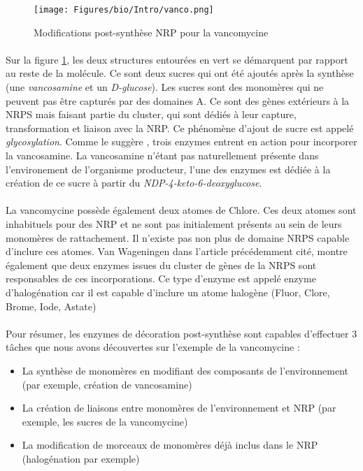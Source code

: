 \documentclass[12pt,french,twoside]{report}
\begin{document}
\begin{figure}[h!]
  \begin{center}
    \texttt{[image: Figures/bio/Intro/vanco.png]}
    \caption{\label{vanco}Modifications post-synthèse NRP pour la vancomycine}
  \end{center}
\end{figure}

\paragraph{}Sur la figure \ref{vanco}, les deux structures entourées en vert se démarquent par rapport au reste de la molécule.
Ce sont deux sucres qui ont été ajoutés après la synthèse (une \textit{vancosamine} et un \textit{D-glucose}).
Les sucres sont des monomères qui ne peuvent pas être capturés par des domaines A.
Ce sont des gènes extérieurs à la NRPS mais faisant partie du cluster, qui sont dédiés à leur capture, transformation et liaison avec la NRP.
Ce phénomène d'ajout de sucre est appelé \textit{glycosylation}.
Comme le suggère \cite{van_wageningen_sequencing_1998}, trois enzymes entrent en action pour incorporer la vancosamine.
La vancosamine n'étant pas naturellement présente dans l'environement de l'organisme producteur, l'une des enzymes est dédiée à la création de ce sucre à partir du \textit{NDP-4-keto-6-deoxyglucose}.

\paragraph{}La vancomycine possède également deux atomes de Chlore.
Ces deux atomes sont inhabituels pour des NRP et ne sont pas initialement présents au sein de leurs monomères de rattachement.
Il n'existe pas non plus de domaine NRPS capable d'inclure ces atomes.
Van Wageningen dans l'article précédemment cité, montre également que deux enzymes issues du cluster de gènes de la NRPS sont responsables de ces incorporations.
Ce type d'enzyme est appelé enzyme d'halogénation car il est capable d'inclure un atome halogène (Fluor, Clore, Brome, Iode, Astate)

\paragraph{}Pour résumer, les enzymes de décoration post-synthèse sont capables d'effectuer 3 tâches que nous avons découvertes sur l'exemple de la vancomycine :
\begin{itemize}
  \item La synthèse de monomères en modifiant des composants de l'environnement (par exemple, création de vancosamine)
  \item La création de liaisons entre monomères de l'environnement et NRP (par exemple, les sucres de la vancomycine)
  \item La modification de morceaux de monomères déjà inclus dans le NRP (halogénation par exemple)
\end{itemize}
\end{document}
